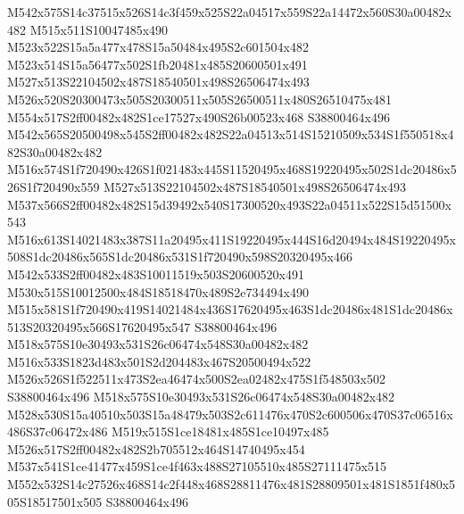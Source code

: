 \documentclass{article}
\begin{document}
\begin{multicols}{2}
M542x575S14c37515x526S14c3f459x525S22a04517x559S22a14472x560S30a00482x482 M515x511S10047485x490 M523x522S15a5a477x478S15a50484x495S2c601504x482 M523x514S15a56477x502S1fb20481x485S20600501x491 M527x513S22104502x487S18540501x498S26506474x493 M526x520S20300473x505S20300511x505S26500511x480S26510475x481 M554x517S2ff00482x482S1ce17527x490S26b00523x468 S38800464x496 M542x565S20500498x545S2ff00482x482S22a04513x514S15210509x534S1f550518x482S30a00482x482 M516x574S1f720490x426S1f021483x445S11520495x468S19220495x502S1dc20486x526S1f720490x559 M527x513S22104502x487S18540501x498S26506474x493 M537x566S2ff00482x482S15d39492x540S17300520x493S22a04511x522S15d51500x543 M516x613S14021483x387S11a20495x411S19220495x444S16d20494x484S19220495x508S1dc20486x565S1dc20486x531S1f720490x598S20320495x466 M542x533S2ff00482x483S10011519x503S20600520x491 M530x515S10012500x484S18518470x489S2e734494x490 M515x581S1f720490x419S14021484x436S17620495x463S1dc20486x481S1dc20486x513S20320495x566S17620495x547 S38800464x496 M518x575S10e30493x531S26c06474x548S30a00482x482 M516x533S1823d483x501S2d204483x467S20500494x522 M526x526S1f522511x473S2ea46474x500S2ea02482x475S1f548503x502 S38800464x496 M518x575S10e30493x531S26c06474x548S30a00482x482 M528x530S15a40510x503S15a48479x503S2c611476x470S2c600506x470S37c06516x486S37c06472x486 M519x515S1ce18481x485S1ce10497x485 M526x517S2ff00482x482S2b705512x464S14740495x454 M537x541S1ce41477x459S1ce4f463x488S27105510x485S27111475x515 M552x532S14c27526x468S14c2f448x468S28811476x481S28809501x481S1851f480x505S18517501x505 S38800464x496


\end{multicols}
\end{document}
